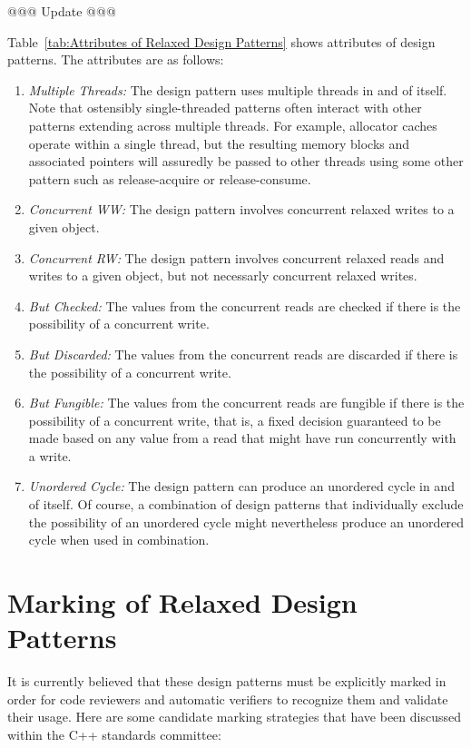 \documentclass[10]{article}
\begin{document}
@@@ Update @@@

Table~\ref{tab:Attributes of Relaxed Design Patterns}
shows attributes of design patterns.
The attributes are as follows:

\begin{enumerate}
\item	\emph{Multiple Threads:}  The design pattern uses multiple threads
	in and of itself.
	Note that ostensibly single-threaded patterns often interact
	with other patterns extending across multiple threads.
	For example, allocator caches operate within a single
	thread, but the resulting memory blocks and associated pointers
	will assuredly be passed to other threads using some other
	pattern such as release-acquire or release-consume.
\item	\emph{Concurrent WW:}  The design pattern involves concurrent
	relaxed writes to a given object.
\item	\emph{Concurrent RW:}  The design pattern involves concurrent
	relaxed reads and writes to a given object, but not necessarly
	concurrent relaxed writes.
\item	\emph{But Checked:}  The values from the concurrent reads are
	checked if there is the possibility of a concurrent write.
\item	\emph{But Discarded:}  The values from the concurrent reads are
	discarded if there is the possibility of a concurrent write.
\item	\emph{But Fungible:}  The values from the concurrent reads are
	fungible if there is the possibility of a concurrent write,
	that is, a fixed decision guaranteed to be made based on any
	value from a read that might have run concurrently with a write.
\item	\emph{Unordered Cycle:}  The design pattern can produce an
	unordered cycle in and of itself.
	Of course, a combination of design patterns that individually
	exclude the possibility of an unordered cycle might nevertheless
	produce an unordered cycle when used in combination.
\end{enumerate}

\section{Marking of Relaxed Design Patterns}
\label{sec:Marking of Relaxed Design Patterns}

It is currently believed that these design patterns must be explicitly marked
in order for code reviewers and automatic verifiers to recognize them
and validate their usage.
Here are some candidate marking strategies that have been discussed
within the C++ standards committee:
\end{document}
